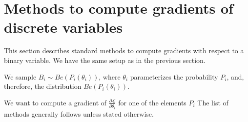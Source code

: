 \documentclass[a4paper,11pt,oneside]{report}
\begin{document}
\section{Methods to compute gradients of discrete variables}
\label{sec:grad_discrete}
This section describes standard methods to compute gradients with respect to a binary variable. We have the same setup as in the previous section.

We sample $B_i\sim Be(P_i(\theta_i))$, where $\theta_i$ parameterizes the probability $P_i$, and, therefore, the distribution $Be(P_i(\theta_i))$.

We want to compute a gradient of $\frac{\partial \mathcal L}{\partial \theta_i}$ for one of the elements $P_i$ The list of methods generally follows \cite{Bengio2013, Weiß2011} unless stated otherwise.
\end{document}
